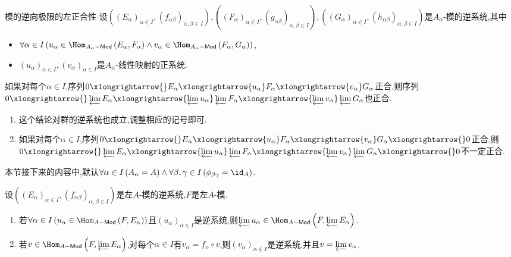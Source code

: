 \begin{proposition}{模的逆向极限的左正合性}{}
	设$\left(\left(E_{\alpha}\right)_{\alpha\in I},\left(f_{\alpha\beta}\right)_{\alpha,\beta\in I}\right),\left(\left(F_{\alpha}\right)_{\alpha\in I},\left(g_{\alpha\beta}\right)_{\alpha,\beta\in I}\right),\left(\left(G_{\alpha}\right)_{\alpha\in I},\left(h_{\alpha\beta}\right)_{\alpha,\beta\in I}\right)$是$A_{\alpha}$-模的逆系统,其中
	\begin{itemize}
		\item $\forall\alpha\in I\left(u_{\alpha}\in\Hom_{A_{\alpha}-\mathsf{Mod}}\left(E_{\alpha},F_{\alpha}\right)\wedge v_{\alpha}\in\Hom_{A_{\alpha}-\mathsf{Mod}}\left(F_{\alpha},G_{\alpha}\right)\right)$,
		\item $\left(u_{\alpha}\right)_{\alpha\in I},\left(v_{\alpha}\right)_{\alpha\in I}$是$A_{\alpha}$-线性映射的正系统.
	\end{itemize}
	如果对每个$\alpha\in I$,序列$0\xlongrightarrow{}E_{\alpha}\xlongrightarrow{u_{\alpha}}F_{\alpha}\xlongrightarrow{v_{\alpha}}G_{\alpha}$正合,则序列$0\xlongrightarrow{}\varprojlim E_{\alpha}\xlongrightarrow{\varprojlim u_{\alpha}}\varprojlim F_{\alpha}\xlongrightarrow{\varprojlim v_{\alpha}}\varprojlim G_{\alpha}$也正合.
\end{proposition}

\begin{remark}{}{}
	\begin{enumerate}
		\item 这个结论对群的逆系统也成立,调整相应的记号即可.
		\item 如果对每个$\alpha\in I$,序列$0\xlongrightarrow{}E_{\alpha}\xlongrightarrow{u_{\alpha}}F_{\alpha}\xlongrightarrow{v_{\alpha}}G_{\alpha}\xlongrightarrow{}0$正合,则$0\xlongrightarrow{}\varprojlim E_{\alpha}\xlongrightarrow{\varprojlim u_{\alpha}}\varprojlim F_{\alpha}\xlongrightarrow{\varprojlim v_{\alpha}}\varprojlim G_{\alpha}\xlongrightarrow{}0$不一定正合.
	\end{enumerate}
\end{remark}

本节接下来的内容中,默认$\forall\alpha\in I\left(A_{\alpha}=A\right)\wedge\forall\beta,\gamma\in I\left(\phi_{\beta\gamma}=\id_{A}\right)$.

\begin{proposition}{}{}
	设$\left(\left(E_{\alpha}\right)_{\alpha\in I},\left(f_{\alpha\beta}\right)_{\alpha,\beta\in I}\right)$是左$A$-模的逆系统,$F$是左$A$-模.
	\begin{enumerate}
		\item 若$\forall\alpha\in I\left(u_{\alpha}\in\Hom_{A-\mathsf{Mod}}\left(F,E_{\alpha}\right)\right)$且$\left(u_{\alpha}\right)_{\alpha\in I}$是逆系统,则$\varprojlim u_{\alpha}\in\Hom_{A-\mathsf{Mod}}\left(F,\varprojlim E_{\alpha}\right)$.
		\item 若$v\in\Hom_{A-\mathsf{Mod}}\left(F,\varprojlim E_{\alpha}\right)$,对每个$\alpha\in I$有$v_{\alpha}=f_{\alpha}\circ v$,则$\left(v_{\alpha}\right)_{\alpha\in I}$是逆系统,并且$v=\varprojlim v_{\alpha}$.
	\end{enumerate}
\end{proposition}

